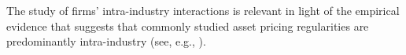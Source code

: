 \documentclass{article}
\begin{document}
The study of firms' intra-industry interactions is relevant in light of the empirical evidence that suggests that commonly studied asset pricing regularities are predominantly intra-industry
(see, e.g., \cite{BBDT2020}).


 

\end{document}
